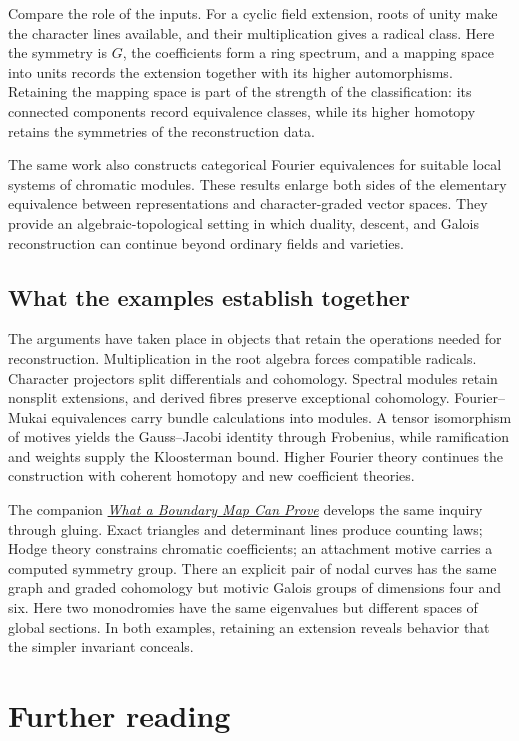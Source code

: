 \documentclass[11pt]{article}
\theoremstyle{remark}
\begin{document}
Compare the role of the inputs. For a cyclic field extension, roots of unity make the character lines available, and their multiplication gives a radical class. Here the symmetry is \(G\), the coefficients form a ring spectrum, and a mapping space into units records the extension together with its higher automorphisms. Retaining the mapping space is part of the strength of the classification: its connected components record equivalence classes, while its higher homotopy retains the symmetries of the reconstruction data.

The same work also constructs categorical Fourier equivalences for suitable local systems of chromatic modules. These results enlarge both sides of the elementary equivalence between representations and character-graded vector spaces. They provide an algebraic-topological setting in which duality, descent, and Galois reconstruction can continue beyond ordinary fields and varieties.

\subsection{What the examples establish together}

The arguments have taken place in objects that retain the operations needed for reconstruction. Multiplication in the root algebra forces compatible radicals. Character projectors split differentials and cohomology. Spectral modules retain nonsplit extensions, and derived fibres preserve exceptional cohomology. Fourier--Mukai equivalences carry bundle calculations into modules. A tensor isomorphism of motives yields the Gauss--Jacobi identity through Frobenius, while ramification and weights supply the Kloosterman bound. Higher Fourier theory continues the construction with coherent homotopy and new coefficient theories.

The companion \href{https://tensorgami.com/notes/what-a-boundary-map-can-prove}{\emph{What a Boundary Map Can Prove}} develops the same inquiry through gluing. Exact triangles and determinant lines produce counting laws; Hodge theory constrains chromatic coefficients; an attachment motive carries a computed symmetry group. There an explicit pair of nodal curves has the same graph and graded cohomology but motivic Galois groups of dimensions four and six. Here two monodromies have the same eigenvalues but different spaces of global sections. In both examples, retaining an extension reveals behavior that the simpler invariant conceals.

\section*{Further reading}
\end{document}
